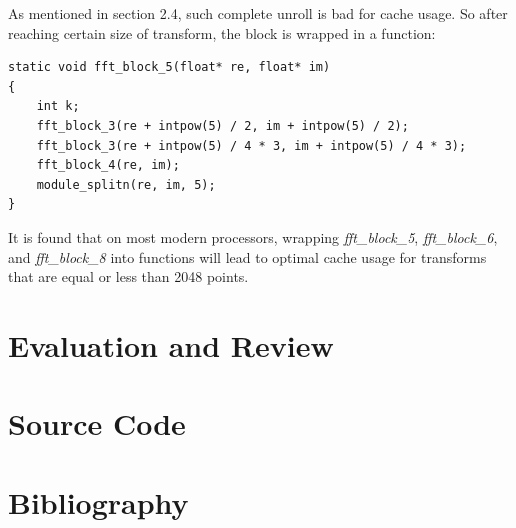 \documentclass[a4paper]{report}
\begin{document}
	As mentioned in section 2.4, such complete unroll is bad for cache usage. So after reaching certain size of transform, the block is wrapped in a function:
	
    \lstset{language = c, tabsize = 4}
    \begin{lstlisting}
static void fft_block_5(float* re, float* im)
{
    int k;
    fft_block_3(re + intpow(5) / 2, im + intpow(5) / 2);
    fft_block_3(re + intpow(5) / 4 * 3, im + intpow(5) / 4 * 3);
    fft_block_4(re, im);
    module_splitn(re, im, 5);
}
    \end{lstlisting}
	
	It is found that on most modern processors, wrapping \textit{fft\_block\_5}, \textit{fft\_block\_6}, and \textit{fft\_block\_8} into functions will lead to optimal cache usage for transforms that are equal or less than 2048 points.

\chapter{Evaluation and Review}

\appendix
\chapter{Source Code}

\chapter{Bibliography}
\end{document}
